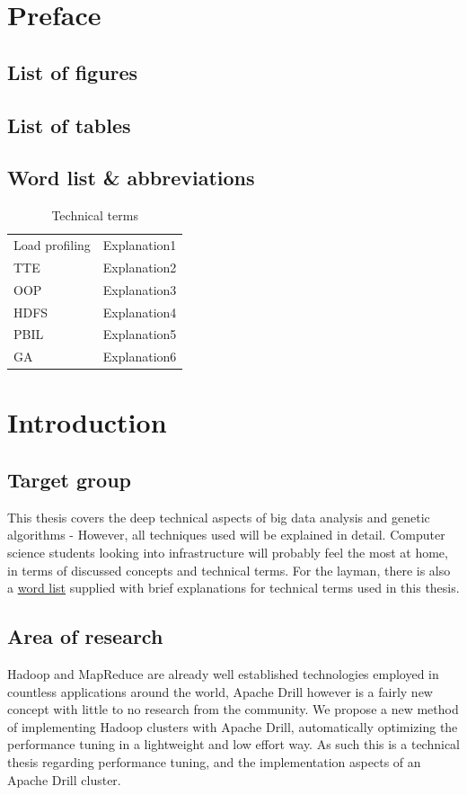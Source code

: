 \documentclass[a4paper,english]{report}
\begin{document}
	\chapter{Preface}
	\section{List of figures}
	\section{List of tables}
	\section{Word list \& abbreviations}
	\label{word_list}
	\begin{table}[h]
		\centering
		\caption{Technical terms}
		\begin{tabular}{ll}
			Load profiling	& Explanation1 \\
			TTE	& Explanation2 \\
			OOP	& Explanation3 \\
			HDFS & Explanation4 \\
			PBIL & Explanation5 \\
			GA & Explanation6 \\
		\end{tabular}
	\end{table}

	
	\chapter{Introduction}
		
		\section{Target group}
		This thesis covers the deep technical aspects of big data analysis and genetic algorithms - However, all techniques used will be explained in detail. Computer science students looking into infrastructure will probably feel the most at home, in terms of discussed concepts and technical terms. For the layman, there is also a \hyperref[word_list]{word list} supplied with brief explanations for technical terms used in this thesis.
		
		\section{Area of research}
		Hadoop and MapReduce are already well established technologies employed in countless applications around the world, Apache Drill however is a fairly new concept with little to no research from the community. We propose a new method of implementing Hadoop clusters with Apache Drill, automatically optimizing the performance tuning in a lightweight and low effort way. As such this is a technical thesis regarding performance tuning, and the implementation aspects of an Apache Drill cluster.
		
\end{document}
